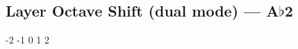 \subsection{Layer Octave Shift (dual mode) --- \UiKey{\SET}A$\flat$2}







































-2
-1
0
1
2
